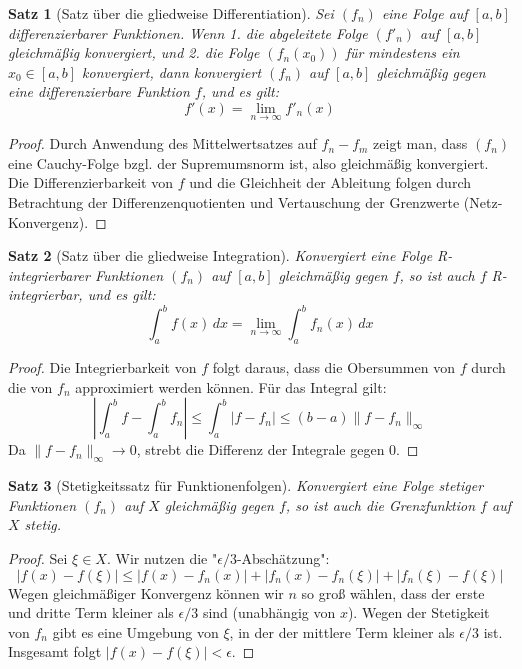 \documentclass{article}
\newtheorem{satz}{Satz}[section]
\theoremstyle{definition}
\begin{document}
\begin{satz}[Satz über die gliedweise Differentiation]
Sei $(f_n)$ eine Folge auf $[a, b]$ differenzierbarer Funktionen. Wenn
1. die abgeleitete Folge $(f'_n)$ auf $[a, b]$ gleichmäßig konvergiert, und
2. die Folge $(f_n(x_0))$ für mindestens ein $x_0 \in [a, b]$ konvergiert,
dann konvergiert $(f_n)$ auf $[a, b]$ gleichmäßig gegen eine differenzierbare Funktion $f$, und es gilt:
$$f'(x) = \lim_{n \to \infty} f'_n(x)$$


\end{satz}
\begin{proof}
Durch Anwendung des Mittelwertsatzes auf $f_n - f_m$ zeigt man, dass $(f_n)$ eine Cauchy-Folge bzgl. der Supremumsnorm ist, also gleichmäßig konvergiert. Die Differenzierbarkeit von $f$ und die Gleichheit der Ableitung folgen durch Betrachtung der Differenzenquotienten und Vertauschung der Grenzwerte (Netz-Konvergenz).
\end{proof}
\begin{satz}[Satz über die gliedweise Integration]
Konvergiert eine Folge R-integrierbarer Funktionen $(f_n)$ auf $[a, b]$ gleichmäßig gegen $f$, so ist auch $f$ R-integrierbar, und es gilt:
$$\int_a^b f(x) \, dx = \lim_{n \to \infty} \int_a^b f_n(x) \, dx$$


\end{satz}
\begin{proof}
Die Integrierbarkeit von $f$ folgt daraus, dass die Obersummen von $f$ durch die von $f_n$ approximiert werden können. Für das Integral gilt:
$$|\int_a^b f - \int_a^b f_n| \le \int_a^b |f - f_n| \le (b-a) \|f - f_n\|_\infty$$
Da $\|f - f_n\|_\infty \to 0$, strebt die Differenz der Integrale gegen 0.
\end{proof}
\begin{satz}[Stetigkeitssatz für Funktionenfolgen]
Konvergiert eine Folge stetiger Funktionen $(f_n)$ auf $X$ gleichmäßig gegen $f$, so ist auch die Grenzfunktion $f$ auf $X$ stetig.


\end{satz}
\begin{proof}
Sei $\xi \in X$. Wir nutzen die "$\epsilon/3$-Abschätzung":
$$|f(x) - f(\xi)| \le |f(x) - f_n(x)| + |f_n(x) - f_n(\xi)| + |f_n(\xi) - f(\xi)|$$
Wegen gleichmäßiger Konvergenz können wir $n$ so groß wählen, dass der erste und dritte Term kleiner als $\epsilon/3$ sind (unabhängig von $x$). Wegen der Stetigkeit von $f_n$ gibt es eine Umgebung von $\xi$, in der der mittlere Term kleiner als $\epsilon/3$ ist. Insgesamt folgt $|f(x) - f(\xi)| < \epsilon$.
\end{proof}
\end{document}
